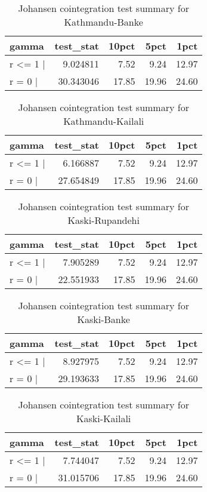 \documentclass[12pt,]{article}
\begin{document}
\begin{longtable}[t]{lrrrr}
\caption{\label{tab:rice-cajo-test}Johansen cointegration test summary for Kathmandu-Banke}\\
\toprule
gamma & test\_stat & 10pct & 5pct & 1pct\\
\midrule
r <= 1 | & 9.024811 & 7.52 & 9.24 & 12.97\\
r = 0  | & 30.343046 & 17.85 & 19.96 & 24.60\\
\bottomrule
\end{longtable}

\begin{longtable}[t]{lrrrr}
\caption{\label{tab:rice-cajo-test}Johansen cointegration test summary for Kathmandu-Kailali}\\
\toprule
gamma & test\_stat & 10pct & 5pct & 1pct\\
\midrule
r <= 1 | & 6.166887 & 7.52 & 9.24 & 12.97\\
r = 0  | & 27.654849 & 17.85 & 19.96 & 24.60\\
\bottomrule
\end{longtable}

\begin{longtable}[t]{lrrrr}
\caption{\label{tab:rice-cajo-test}Johansen cointegration test summary for Kaski-Rupandehi}\\
\toprule
gamma & test\_stat & 10pct & 5pct & 1pct\\
\midrule
r <= 1 | & 7.905289 & 7.52 & 9.24 & 12.97\\
r = 0  | & 22.551933 & 17.85 & 19.96 & 24.60\\
\bottomrule
\end{longtable}

\begin{longtable}[t]{lrrrr}
\caption{\label{tab:rice-cajo-test}Johansen cointegration test summary for Kaski-Banke}\\
\toprule
gamma & test\_stat & 10pct & 5pct & 1pct\\
\midrule
r <= 1 | & 8.927975 & 7.52 & 9.24 & 12.97\\
r = 0  | & 29.193633 & 17.85 & 19.96 & 24.60\\
\bottomrule
\end{longtable}

\begin{longtable}[t]{lrrrr}
\caption{\label{tab:rice-cajo-test}Johansen cointegration test summary for Kaski-Kailali}\\
\toprule
gamma & test\_stat & 10pct & 5pct & 1pct\\
\midrule
r <= 1 | & 7.744047 & 7.52 & 9.24 & 12.97\\
r = 0  | & 31.015706 & 17.85 & 19.96 & 24.60\\
\bottomrule
\end{longtable}
\end{document}
